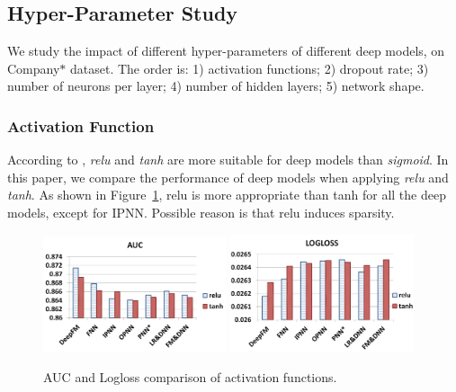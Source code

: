 \subsection{Hyper-Parameter Study}\label{sec:exp:hyper}

We study the impact of different hyper-parameters of different deep models, on Company$\ast$ dataset. The order is: 1) activation functions; 2) dropout rate; 3) number of neurons per layer; 4) number of hidden layers; 5) network shape.

\subsubsection{Activation Function}\label{sec:exp:hyper:act}

According to \cite{pnn}, \emph{relu} and \emph{tanh} are more suitable for deep models than \emph{sigmoid}. In this paper, we compare the performance of deep models when applying \emph{relu} and \emph{tanh}. As shown in Figure~\ref{fig:act}, relu is more appropriate than tanh for all the deep models, except for IPNN. Possible reason is that relu induces sparsity.

\begin{figure}[ht]
\setlength{\abovecaptionskip}{0pt}%
\setlength{\belowcaptionskip}{-10pt}
\centering
\begin{minipage}[b]{0.5\textwidth}
\includegraphics[width=0.48\textwidth]{img/act-auc.png}
\includegraphics[width=0.48\textwidth]{img/act-logloss.png}
\end{minipage}
\caption{\footnotesize{AUC and Logloss comparison of activation functions.}}\label{fig:act}
\end{figure}

